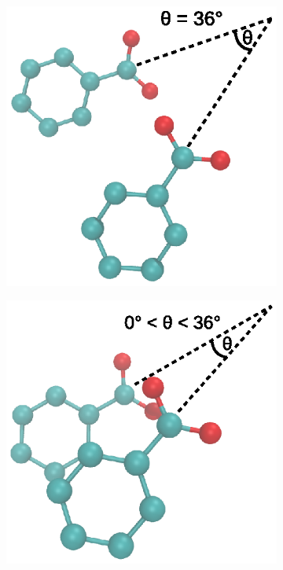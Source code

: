 \documentclass[journal=jpcbfk,manuscript=article]{achemso}
\begin{document}
  \begin{figure}[!htb]
  \centering
  \begin{subfigure}{0.45\textwidth}
  \centering
  \includegraphics[width=\textwidth]{pd_36.eps}
  \caption{}\label{fig:pd_36}
  \end{subfigure}
  \begin{subfigure}{0.45\textwidth}
  \centering
  \includegraphics[width=\textwidth]{pd_lt36.eps}

\end{subfigure}
\end{figure}
\end{document}
